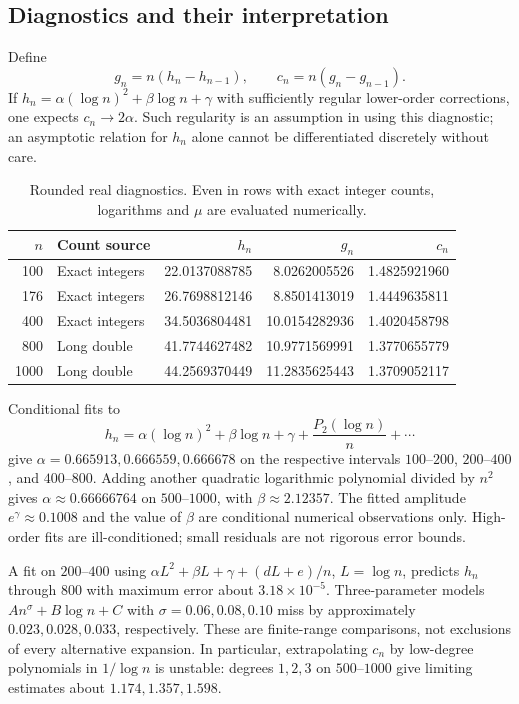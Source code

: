 \documentclass[11pt,letterpaper]{article}
\theoremstyle{remark}
\begin{document}
\subsection{Diagnostics and their interpretation}
Define
\[
 g_n=n(h_n-h_{n-1}),\qquad c_n=n(g_n-g_{n-1}).
\]
If $h_n=\alpha(\log n)^2+\beta\log n+\gamma$ with sufficiently regular lower-order corrections, one expects $c_n\to2\alpha$. Such regularity is an assumption in using this diagnostic; an asymptotic relation for $h_n$ alone cannot be differentiated discretely without care.

\begin{table}[htbp]
\centering
\begin{tabular}{r l r r r}
\toprule
$n$ & Count source & $h_n$ & $g_n$ & $c_n$\\
\midrule
100 & Exact integers & 22.0137088785 & 8.0262005526 & 1.4825921960\\
176 & Exact integers & 26.7698812146 & 8.8501413019 & 1.4449635811\\
400 & Exact integers & 34.5036804481 & 10.0154282936 & 1.4020458798\\
800 & Long double & 41.7744627482 & 10.9771569991 & 1.3770655779\\
1000 & Long double & 44.2569370449 & 11.2835625443 & 1.3709052117\\
\bottomrule
\end{tabular}
\caption{Rounded real diagnostics. Even in rows with exact integer counts, logarithms and $\mu$ are evaluated numerically.}
\label{a58:fn:tab:data}
\end{table}

Conditional fits to
\begin{equation}\label{a58:fn:eq:fit}
 h_n=\alpha(\log n)^2+\beta\log n+\gamma
             +\frac{P_2(\log n)}n+\cdots
\end{equation}
give $\alpha=0.665913,0.666559,0.666678$ on the respective intervals $100$--$200$, $200$--$400$, and $400$--$800$. Adding another quadratic logarithmic polynomial divided by $n^2$ gives $\alpha\approx0.66666764$ on $500$--$1000$, with $\beta\approx2.12357$. The fitted amplitude $e^\gamma\approx0.1008$ and the value of $\beta$ are conditional numerical observations only. High-order fits are ill-conditioned; small residuals are not rigorous error bounds.

A fit on $200$--$400$ using
$\alpha L^2+\beta L+\gamma+(dL+e)/n$, $L=\log n$, predicts $h_n$ through $800$ with maximum error about $3.18\times10^{-5}$. Three-parameter models $An^\sigma+B\log n+C$ with $\sigma=0.06,0.08,0.10$ miss by approximately $0.023,0.028,0.033$, respectively. These are finite-range comparisons, not exclusions of every alternative expansion. In particular, extrapolating $c_n$ by low-degree polynomials in $1/\log n$ is unstable: degrees $1,2,3$ on $500$--$1000$ give limiting estimates about $1.174,1.357,1.598$.
\end{document}
